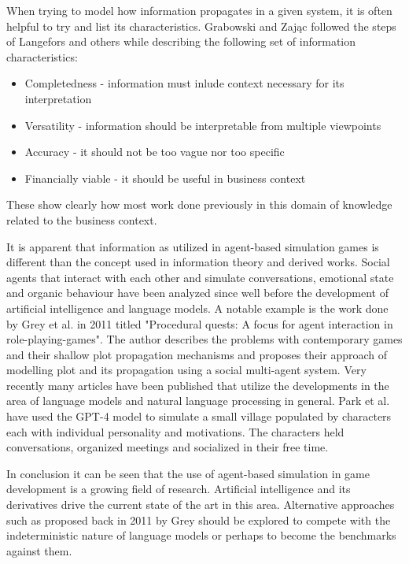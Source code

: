When trying to model how information propagates in a given system, it is often helpful to try and list its characteristics.
Grabowski and Zając followed the steps of Langefors and others while describing the following set of information characteristics:
\begin{itemize}
    \item Completedness - information must inlude context necessary for its interpretation
    \item Versatility - information should be interpretable from multiple viewpoints
    \item Accuracy - it should not be too vague nor too specific
    \item Financially viable - it should be useful in business context
\end{itemize}
These show clearly how most work done previously in this domain of knowledge related to the business context.

It is apparent that information as utilized in agent-based simulation games is different than the concept used in information theory and derived works.
Social agents that interact with each other and simulate conversations, emotional state and organic behaviour have been analyzed since well before the development of artificial intelligence and language models.
A notable example is the work done by Grey et al. in 2011 titled "Procedural quests: A focus for agent interaction in role-playing-games"\cite{grey2011procedural}.
The author describes the problems with contemporary games and their shallow plot propagation mechanisms and proposes their approach of modelling plot and its propagation using a social multi-agent system.
Very recently many articles have been published that utilize the developments in the area of language models and natural language processing in general.
Park et al.\cite{park2023generative} have used the GPT-4 model\cite{openai2023gpt4} to simulate a small village populated by characters each with individual personality and motivations.
The characters held conversations, organized meetings and socialized in their free time.

In conclusion it can be seen that the use of agent-based simulation in game development is a growing field of research.
Artificial intelligence and its derivatives drive the current state of the art in this area.
Alternative approaches such as proposed back in 2011 by Grey\cite{grey2011procedural} should be explored to compete with the indeterministic nature of language models or perhaps to become the benchmarks against them.